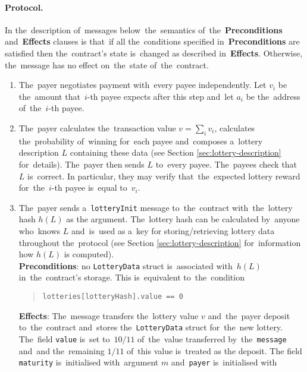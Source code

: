 \documentclass[a4paper]{article}
\newcommand{\lotteryhash}[1]{h({#1})}
\begin{document}
\paragraph{Protocol.}
    In the~description of~messages below~the~semantics of~the~\textbf{Preconditions} and~\textbf{Effects} clauses is
    that~if all the~conditions specified in~\textbf{Preconditions} are satisfied then the~contract's state is~changed
    as described in~\textbf{Effects}. Otherwise, the~message has no effect on~the~state of~the~contract.
    \begin{enumerate}
        \item The~payer negotiates payment with~every payee independently. Let $v_i$ be the~amount that~$i$-th payee
            expects after this step and~let $a_i$ be the~address of~the~$i$-th payee.
        \item The~payer calculates the~transaction value $v = \sum_i v_i$, calculates the~probability of~winning
            for~each payee and~composes a~lottery description $L$ containing these data (see Section
            \ref{sec:lottery-description} for~details). The~payer then sends $L$ to~every payee. The~payees check that~$L$
            is~correct. In particular, they may verify that~the~expected lottery reward for~the~$i$-th payee is~equal
            to~$v_i$.
        \item The~payer sends a~\texttt{lotteryInit} message to~the~contract with~the~lottery hash $\lotteryhash{L}$ as the
          argument. The~lottery hash can be calculated by~anyone who~knows $L$ and~is~used as a~key for
          storing/retrieving lottery data throughout the~protocol (see Section \ref{sec:lottery-description} for~information
          how $\lotteryhash{L}$ is computed).\\
            \textbf{Preconditions}: no \texttt{LotteryData} struct is~associated with~$\lotteryhash{L}$ in~the~contract's
            storage. This is~equivalent to~the~condition
            \begin{quote}
	      \verb!lotteries[lotteryHash].value == 0!
            \end{quote}
            \textbf{Effects}: The~message transfers the~lottery value $v$ and~the~payer deposit to~the~contract and~stores 
            the~\texttt{LotteryData} struct for~the~new lottery. The~field \verb!value! is~set to~$10/11$ of~the~value 
            transferred by~the~\texttt{message} and~and the~remaining $1/11$ of~this value is~treated as the deposit. 
            The field \texttt{maturity} is~initialised with~argument $m$ and~\texttt{payer} is~initialised with

\end{enumerate}
\end{document}
